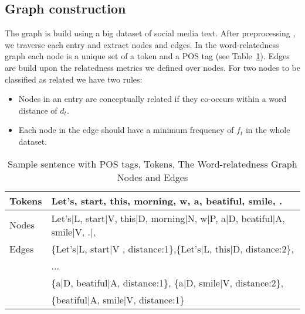 \subsection{Graph construction}

The graph is build using a big dataset of social media text. After preprocessing , we traverse each entry and extract nodes and edges.
In the word-relatedness graph each node is a unique set of a token and a POS tag (see Table~\ref{tab:graph}). Edges are build upon the relatedness metrics we defined over nodes. For two nodes to be classified as related we have two rules:
\begin{itemize}
\item Nodes in an entry are conceptually related if they co-occurs within a word distance of $d_t$.
\item Each node in the edge should have a minimum frequency of $f_t$ in the whole dataset.
\end{itemize}

\begin{table}[tbhp]
\begin{minipage}[c]{\linewidth}
\par
\vspace{5mm}
\end{minipage}
\begin{minipage}[c]{\linewidth}
\begin{tabular}[h]{l|l}
Tokens & Let's, start, this, morning, w, a, beatiful, smile, . \\
\hline
Nodes & Let's$|$L, start$|$V, this$|$D, morning$|$N, w$|$P, a$|$D, beatiful$|$A, smile$|$V, .$|$, \\
\hline
Edges & \{Let's$|$L, start$|$V , distance:1\},\{Let's$|$L, this$|$D, distance:2\}, \\
& ... \\
& \{a$|$D, beatiful$|$A, distance:1\}, \{a$|$D, smile$|$V, distance:2\}, \\
& \{beatiful$|$A, smile$|$V, distance:1\} \\
\end{tabular}
\end{minipage}
\caption{Sample sentence with POS tags, Tokens, The Word-relatedness Graph Nodes and Edges}
\label{tab:graph}
\end{table}

